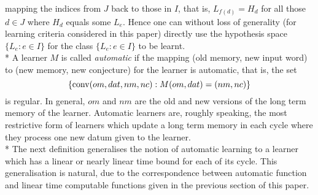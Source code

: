 \documentclass{LMCS}
\theoremstyle{plain}\newtheorem{athm}[thm]{Theorem}
\theoremstyle{plain}\newtheorem{aprop}[thm]{Proposition}
\theoremstyle{plain}\newtheorem{aprob}[thm]{Open Problem}
\theoremstyle{plain}\newtheorem{acor}[thm]{Corollary}
\theoremstyle{plain}\newtheorem{alem}[thm]{Lemma}
\theoremstyle{definition}\newtheorem{adefn}[thm]{Definition}
\theoremstyle{definition}\newtheorem{arem}[thm]{Remark}
\theoremstyle{plain}\newtheorem{aexmp}[thm]{Example}
\theoremstyle{plain}\newtheorem{aclm}[thm]{Claim}
\def\conv{{\rm{conv}}}
\def\sp{\\*\indent}
\begin{document}
mapping the indices from $J$ back to those in $I$, that is, $L_{f(d)} = H_d$
for all those $d \in J$ where $H_d$ equals some $L_e$. Hence one can
without loss of generality (for learning criteria considered in
this paper) directly use the hypothesis space
$\{L_e: e \in I\}$ for the class $\{L_e:e \in I\}$ to be learnt.
\sp
A learner $M$ is called {\em automatic}
if the mapping (old memory, new input word) to 
(new memory, new conjecture) for the learner is automatic, that is,
the set
$$
   \{\conv(om,dat,nm,nc): M(om,dat)=(nm,nc)\}
$$
is regular. In general, $om$ and $nm$ are the old and new versions
of the long term memory of the learner. Automatic learners are, roughly
speaking, the most restrictive form of learners which update a long term
memory in each cycle where they process one new datum given to the learner.
\sp
The next definition generalises the notion of automatic learning to
a learner which has a linear or nearly linear time bound for each of
its cycle. This generalisation is natural, due to the correspondence
between automatic function and linear time computable functions given
in the previous section of this paper.
\end{document}
